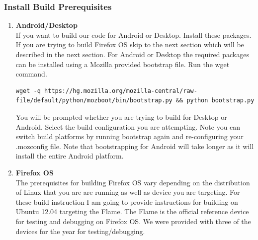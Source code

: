 \documentclass[12pt]{article}
\begin{document}
\subsubsection{Install Build Prerequisites}
	\begin{enumerate}
	\item \textbf{Android/Desktop} \\
	If you want to build our code for Android or Desktop. Install these packages.  If you are trying to
	build Firefox OS skip to the next section which will be described in the next section. For Android or 
	Desktop the required packages can be installed using a Mozilla provided bootstrap file.  Run the
	wget command.  
	
	\begin{lstlisting}[style=BashInputStyle, breaklines=true]
	wget -q https://hg.mozilla.org/mozilla-central/raw-file/default/python/mozboot/bin/bootstrap.py && python bootstrap.py
	\end{lstlisting}

	You will be prompted whether you are trying to build for Desktop or Android. Select the build configuration you are  		attempting.  Note you can switch build platforms by running bootstrap again and re-configuring your .mozconfig file.  Note that bootstrapping for Android will take longer as it will install the entire Android platform.
	\item \textbf{Firefox OS}\\
	The prerequisites for building Firefox OS vary depending on the distribution of Linux that you are are running as well as device you are targeting.  For these build instruction I am going to provide instructions for building on Ubuntu 12.04 targeting the Flame. The Flame is the official reference device for testing and debugging on Firefox OS.  We were provided with three of the devices for the year for testing/debugging.  
	

\end{enumerate}
\end{document}
